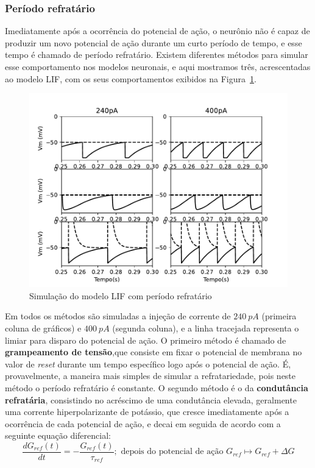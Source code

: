 \subsubsection{Período refratário}
Imediatamente após a ocorrência do potencial de ação, o neurônio não é capaz de produzir um novo potencial de ação durante um curto período de tempo, e esse tempo é chamado de período refratário. Existem diferentes métodos para simular esse comportamento nos modelos neuronais, e aqui mostramos três, acrescentadas ao modelo LIF, com os seus comportamentos exibidos na Figura~\ref{fig:lifrefratario}.
\begin{figure}[tb]
	\centering
	\caption{Simulação do modelo LIF com período refratário}
	\label{fig:lifrefratario}
	\includegraphics[width=0.7\linewidth]{figs/lif_refratario}
\end{figure}
Em todos os métodos são simuladas a injeção de corrente de $240\ pA$ (primeira coluna de gráficos) e $400\ pA$ (segunda coluna), e a linha tracejada representa o limiar para disparo do potencial de ação. O primeiro método é chamado de \textbf{grampeamento de tensão},que consiste em fixar o potencial de membrana no valor de \textit{reset} durante um tempo específico logo após o potencial de ação. É, provavelmente, a maneira mais simples de simular a refratariedade, pois neste método o período refratário é constante. O segundo método é o da \textbf{condutância refratária}, consistindo no acréscimo de uma condutância elevada, geralmente uma corrente hiperpolarizante de potássio, que cresce imediatamente após a ocorrência de cada potencial de ação, e decai em seguida de acordo com a seguinte equação diferencial:
\begin{equation}\label{eq:condutancia_refrataria}
	\frac{dG_{ref}(t)}{dt} = -\frac{G_{ref}(t)}{\tau_{ref}};\text{ depois do potencial de ação } G_{ref} \mapsto G_{ref} + \Delta G
\end{equation}
